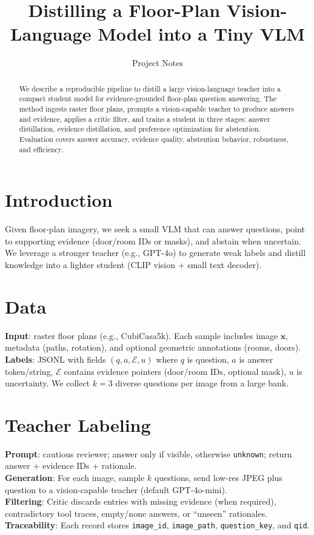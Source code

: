 \documentclass[11pt]{article}
\title{Distilling a Floor-Plan Vision-Language Model into a Tiny VLM}
\author{Project Notes}
\date{}
\begin{document}
\maketitle

\begin{abstract}
We describe a reproducible pipeline to distill a large vision-language teacher into a compact student model for evidence-grounded floor-plan question answering. The method ingests raster floor plans, prompts a vision-capable teacher to produce answers and evidence, applies a critic filter, and trains a student in three stages: answer distillation, evidence distillation, and preference optimization for abstention. Evaluation covers answer accuracy, evidence quality, abstention behavior, robustness, and efficiency.
\end{abstract}

\section{Introduction}
Given floor-plan imagery, we seek a small VLM that can answer questions, point to supporting evidence (door/room IDs or masks), and abstain when uncertain. We leverage a stronger teacher (e.g., GPT-4o) to generate weak labels and distill knowledge into a lighter student (CLIP vision + small text decoder).

\section{Data}
\textbf{Input}: raster floor plans (e.g., CubiCasa5k). Each sample includes image $\mathbf{x}$, metadata (paths, rotation), and optional geometric annotations (rooms, doors).\\
\textbf{Labels}: JSONL with fields $(q, a, \mathcal{E}, u)$ where $q$ is question, $a$ is answer token/string, $\mathcal{E}$ contains evidence pointers (door/room IDs, optional mask), $u$ is uncertainty. We collect $k=3$ diverse questions per image from a large bank.

\section{Teacher Labeling}
\textbf{Prompt}: cautious reviewer; answer only if visible, otherwise \texttt{unknown}; return answer + evidence IDs + rationale.\\
\textbf{Generation}: For each image, sample $k$ questions, send low-res JPEG plus question to a vision-capable teacher (default GPT-4o-mini).\\
\textbf{Filtering}: Critic discards entries with missing evidence (when required), contradictory tool traces, empty/none answers, or ``unseen'' rationales.\\
\textbf{Traceability}: Each record stores \texttt{image\_id}, \texttt{image\_path}, \texttt{question\_key}, and \texttt{qid}.
\end{document}
